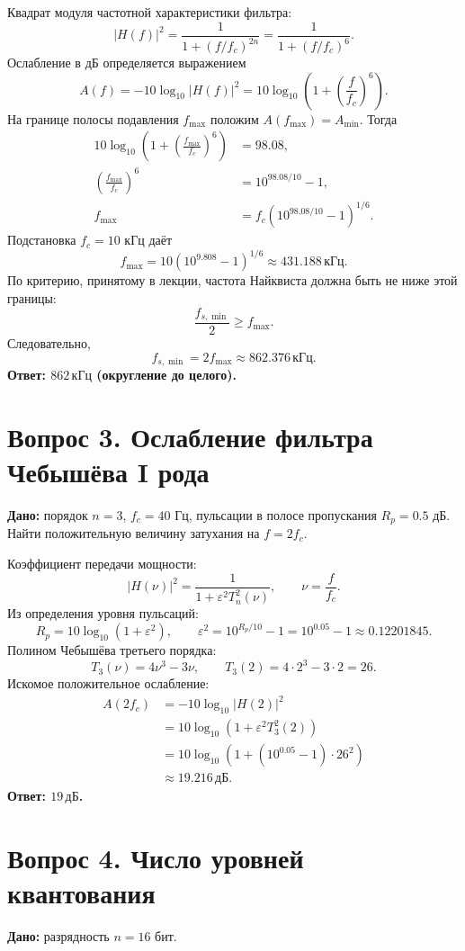 \documentclass[12pt,a4paper]{article}
\begin{document}
Квадрат модуля частотной характеристики фильтра:
\[
|H(f)|^2=\frac{1}{1+(f/f_c)^{2n}}=\frac{1}{1+(f/f_c)^6}.
\]
Ослабление в дБ определяется выражением
\[
A(f)=-10\log_{10}|H(f)|^2
=10\log_{10}\!\left(1+\left(\frac{f}{f_c}\right)^6\right).
\]
На границе полосы подавления $f_{\max}$ положим $A(f_{\max})=A_{\min}$. Тогда
\begin{align*}
10\log_{10}\!\left(1+\left(\frac{f_{\max}}{f_c}\right)^6\right)&=98.08,\\
\left(\frac{f_{\max}}{f_c}\right)^6&=10^{98.08/10}-1,\\
f_{\max}&=f_c\left(10^{98.08/10}-1\right)^{1/6}.
\end{align*}
Подстановка $f_c=10$ кГц даёт
\[
f_{\max}=10\left(10^{9.808}-1\right)^{1/6}\approx431.188\,\text{кГц}.
\]
По критерию, принятому в лекции, частота Найквиста должна быть не ниже этой границы:
\[
\frac{f_{s,\min}}2\ge f_{\max}.
\]
Следовательно,
\[
f_{s,\min}=2f_{\max}\approx862.376\,\text{кГц}.
\]
\textbf{Ответ: $\boxed{862\,\text{кГц}}$ (округление до целого).}

\section*{Вопрос 3. Ослабление фильтра Чебышёва I рода}
\textbf{Дано:} порядок $n=3$, $f_c=40$ Гц, пульсации в полосе пропускания $R_p=0.5$ дБ. Найти положительную величину затухания на $f=2f_c$.

Коэффициент передачи мощности:
\[
|H(\nu)|^2=\frac{1}{1+\varepsilon^2T_n^2(\nu)},\qquad \nu=\frac{f}{f_c}.
\]
Из определения уровня пульсаций:
\[
R_p=10\log_{10}(1+\varepsilon^2),\qquad
\varepsilon^2=10^{R_p/10}-1=10^{0.05}-1\approx0.12201845.
\]
Полином Чебышёва третьего порядка:
\[
T_3(\nu)=4\nu^3-3\nu,\qquad T_3(2)=4\cdot2^3-3\cdot2=26.
\]
Искомое положительное ослабление:
\begin{align*}
A(2f_c)&=-10\log_{10}|H(2)|^2\\
&=10\log_{10}\left(1+\varepsilon^2T_3^2(2)\right)\\
&=10\log_{10}\left(1+(10^{0.05}-1)\cdot26^2\right)\\
&\approx19.216\,\text{дБ}.
\end{align*}
\textbf{Ответ: $\boxed{19\,\text{дБ}}$.}

\section*{Вопрос 4. Число уровней квантования}
\textbf{Дано:} разрядность $n=16$ бит.
\end{document}
